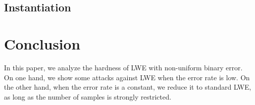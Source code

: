 \documentclass[a4paper]{article}
\theoremstyle{definition}
\theoremstyle{remark}
\begin{document}
\subsection{Instantiation}
\section{Conclusion}
In this paper, we analyze the hardness of LWE with non-uniform binary error. On one hand, we 
show some attacks against LWE when the error rate is low. On the other hand, when the 
error rate is a constant, we reduce it to standard LWE, as long as the number of samples 
is strongly restricted.


 
\end{document}
